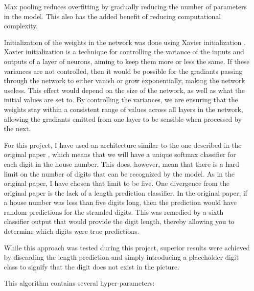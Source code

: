 \documentclass[12pt]{article}
\begin{document}
Max pooling reduces overfitting by gradually reducing the number of parameters in the model.
This also has the added benefit of reducing computational complexity. 

Initialization of the weights in the network was done using Xavier initialization \cite{xavier}.
Xavier initialization is a technique for controlling the variance of the inputs and outputs of a layer of neurons, aiming to keep them more or less the same.
If these variances are not controlled, then it would be possible for the gradiants passing through the network to either vanish or grow exponentially, making the network useless. 
This effect would depend on the size of the network, as well as what the initial values are set to.
By controlling the variances, we are ensuring that the weights stay within a consistent range of values across all layers in the network, allowing the gradiants emitted from one layer to be sensible when processed by the next.

For this project, I have used an architecture similar to the one described in the original paper \cite{svhn_original_paper}, which means that we will have a unique softmax classifier for each digit in the house number.
This does, however, mean that there is a hard limit on the number of digits that can be recognized by the model.
As in the original paper, I have chosen that limit to be five.
One divergence from the original paper is the lack of a length prediction classifier.
In the original paper, if a house number was less than five digits long, then the prediction would have random predictions for the stranded digits.
This was remedied by a sixth classifier output that would provide the digit length, thereby allowing you to determine which digits were true predictions.

While this approach was tested during this project, superior results were achieved by discarding the length prediction and simply introducing a placeholder digit class to signify that the digit does not exist in the picture.

This algorithm contains several hyper-parameters:
\end{document}
